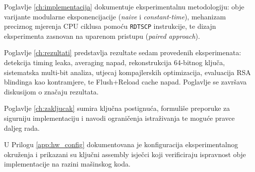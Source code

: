 Poglavlje \ref{ch:implementacija} dokumentuje eksperimentalnu metodologiju: obje varijante modularne eksponencijacije (\textit{naive} i \textit{constant-time}), mehanizam preciznog mjerenja CPU ciklusa pomoću \texttt{RDTSCP} instrukcije, te dizajn eksperimenta zasnovan na uparenom pristupu (\textit{paired approach}).

Poglavlje \ref{ch:rezultati} predstavlja rezultate sedam provedenih eksperimenata: detekcija timing leaka, averaging napad, rekonstrukcija 64-bitnog ključa, sistematska multi-bit analiza, utjecaj kompajlerskih optimizacija, evaluacija RSA blindinga kao kontramjere, te Flush+Reload cache napad. Poglavlje se završava diskusijom o značaju rezultata.

Poglavlje \ref{ch:zakljucak} sumira ključna postignuća, formuliše preporuke za sigurniju implementaciju i navodi ograničenja istraživanja te moguće pravce daljeg rada.

U Prilogu \ref{app:hw_config} dokumentovana je konfiguracija eksperimentalnog okruženja i prikazani su ključni assembly isječci koji verificiraju ispravnost obje implementacije na razini mašinskog koda.


